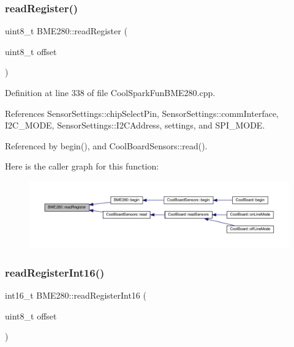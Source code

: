 \subsubsection{\texorpdfstring{read\+Register()}{readRegister()}}
{\footnotesize\ttfamily uint8\+\_\+t B\+M\+E280\+::read\+Register (\begin{DoxyParamCaption}\item[{uint8\+\_\+t}]{offset }\end{DoxyParamCaption})}



Definition at line 338 of file Cool\+Spark\+Fun\+B\+M\+E280.\+cpp.



References Sensor\+Settings\+::chip\+Select\+Pin, Sensor\+Settings\+::comm\+Interface, I2\+C\+\_\+\+M\+O\+DE, Sensor\+Settings\+::\+I2\+C\+Address, settings, and S\+P\+I\+\_\+\+M\+O\+DE.



Referenced by begin(), and Cool\+Board\+Sensors\+::read().

Here is the caller graph for this function\+:
\nopagebreak
\begin{figure}[H]
\begin{center}
\leavevmode
\includegraphics[width=350pt]{df/dcf/class_b_m_e280_a1bbd14c8591966df531e40085342ff71_icgraph}
\end{center}
\end{figure}
\mbox{\label{class_b_m_e280_ac43c30f9b321d301694094d6b4bebe7e}} 
\subsubsection{\texorpdfstring{read\+Register\+Int16()}{readRegisterInt16()}}
{\footnotesize\ttfamily int16\+\_\+t B\+M\+E280\+::read\+Register\+Int16 (\begin{DoxyParamCaption}\item[{uint8\+\_\+t}]{offset }\end{DoxyParamCaption})}



